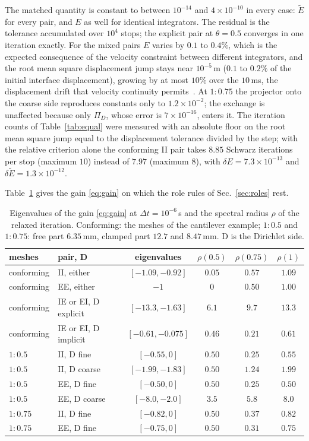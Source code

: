 \documentclass[11pt]{article}
\begin{document}
The matched quantity is constant to between $10^{-14}$ and
$4\times 10^{-10}$ in every case: $\tilde{E}$ for every pair, and $E$ as
well for identical integrators. The residual is the tolerance accumulated
over $10^4$ stops; the explicit pair at $\theta = 0.5$ converges in one
iteration exactly. For the mixed pairs $E$ varies by $0.1$ to $0.4\%$, which
is the expected consequence of the velocity constraint between different
integrators, and the root mean square displacement jump stays near
$10^{-5}$\,m ($0.1$ to $0.2\%$ of the initial interface displacement),
growing by at most $10\%$ over the $10$\,ms, the displacement drift that
velocity continuity permits~\cite{MahjoubiGravouilCombescure2009}. At
$1{:}0.75$ the projector onto the coarse side reproduces constants only to
$1.2\times 10^{-2}$; the exchange is unaffected because only $\Pi_D$, whose
error is $7\times 10^{-16}$, enters it. The iteration counts of
Table~\ref{tab:equal} were measured with an absolute floor on the root mean
square jump equal to the displacement tolerance divided by the step; with
the relative criterion alone the conforming II pair takes $8.85$ Schwarz
iterations per stop (maximum $10$) instead of $7.97$ (maximum $8$), with
$\delta E = 7.3\times 10^{-13}$ and $\delta\tilde{E} = 1.3\times 10^{-12}$.

Table~\ref{tab:dn-gain} gives the gain \eqref{eq:gain} on which the role
rules of Sec.~\ref{sec:roles} rest.

\begin{table}[htbp]
\centering
\footnotesize
\caption{Eigenvalues of the gain \eqref{eq:gain} at
$\Delta t = 10^{-6}$\,s and the spectral radius $\rho$ of the relaxed
iteration. Conforming: the meshes of the cantilever example; $1{:}0.5$
and $1{:}0.75$: free part $6.35$\,mm, clamped part $12.7$ and
$8.47$\,mm. D is the Dirichlet side.}
\label{tab:dn-gain}
\begin{tabular}{llcccc}
\toprule
meshes & pair, D & eigenvalues & $\rho(0.5)$ & $\rho(0.75)$ & $\rho(1)$ \\
\midrule
conforming & II, either & $[-1.09, -0.92]$ & $0.05$ & $0.57$ & $1.09$ \\
conforming & EE, either & $-1$ & $0$ & $0.50$ & $1.00$ \\
conforming & IE or EI, D explicit & $[-13.3, -1.63]$ & $6.1$ & $9.7$ & $13.3$ \\
conforming & IE or EI, D implicit & $[-0.61, -0.075]$ & $0.46$ & $0.21$ & $0.61$ \\
$1{:}0.5$ & II, D fine & $[-0.55, 0]$ & $0.50$ & $0.25$ & $0.55$ \\
$1{:}0.5$ & II, D coarse & $[-1.99, -1.83]$ & $0.50$ & $1.24$ & $1.99$ \\
$1{:}0.5$ & EE, D fine & $[-0.50, 0]$ & $0.50$ & $0.25$ & $0.50$ \\
$1{:}0.5$ & EE, D coarse & $[-8.0, -2.0]$ & $3.5$ & $5.8$ & $8.0$ \\
$1{:}0.75$ & II, D fine & $[-0.82, 0]$ & $0.50$ & $0.37$ & $0.82$ \\
$1{:}0.75$ & EE, D fine & $[-0.75, 0]$ & $0.50$ & $0.31$ & $0.75$ \\
\bottomrule
\end{tabular}
\end{table}
\end{document}

